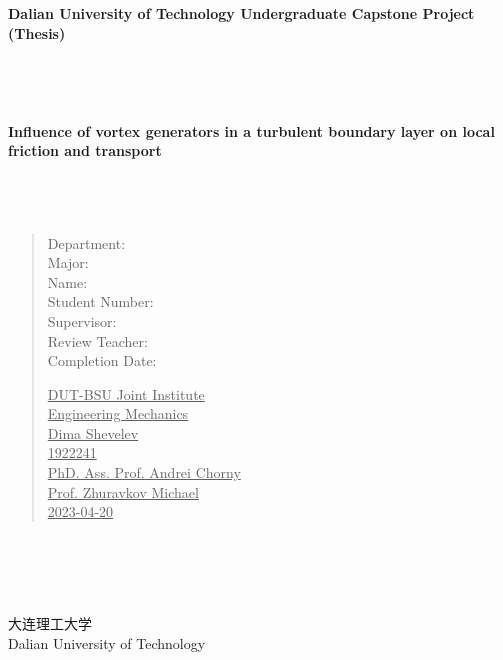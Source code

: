 \documentclass[12pt, a4paper]{article}
\begin{document}
	\begin{titlepage}
		\begin{center}
			\LARGE{\textbf{Dalian University of Technology Undergraduate Capstone Project (Thesis)}}
			~~~
			\\
			~~~
			\\
			~~~
			\\
			~~~
			\\
			~~~
			\\
			\Large{\textbf{Influence of vortex generators in a turbulent boundary layer on local friction and transport}}
			~~~
			\\
			~~~
			\\
			~~~
			\\
			~~~
			\\
			\begin{verse}
			\begin{minipage}{0.3\textwidth}
				Department:\\  
				Major:\\
				Name:\\                 
				Student Number:\\                
				Supervisor:\\          
				Review Teacher:\\
				Completion Date:\\
			\end{minipage}
			\hfill
			\begin{minipage}{0.6\textwidth}
				\underline{\hspace{1cm}DUT-BSU Joint Institute\hspace{1.9cm}}\\   
				\underline{\hspace{1cm}Engineering Mechanics\hspace{2.15cm}}\\  
				\underline{\hspace{1cm}Dima Shevelev\hspace{3.85cm}}\\   
				\underline{\hspace{1cm}1922241\hspace{5.15cm}}\\
				\underline{\hspace{1cm}PhD. Ass. Prof. Andrei Chorny\hspace{0.5cm}}\\ 
				\underline{\hspace{1cm}Prof. Zhuravkov Michael\hspace{2cm}}\\
				\underline{\hspace{1cm}2023-04-20\hspace{5.5cm}}\\  
			\end{minipage}
			\end{verse}
			~~~
			\\
			~~~
			\\
			~~~
			\\
			~~~
			\\
			\Large{大连理工大学}
			~~~
			\\
			Dalian University of Technology
		\end{center}  
	\end{titlepage}
\end{document}
